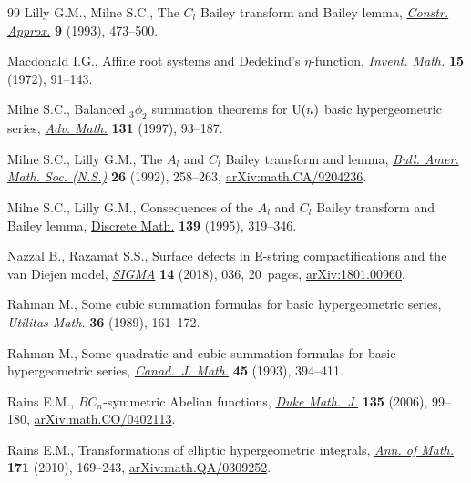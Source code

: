 \documentclass[pdftex]{sigma}%
\numberwithin{equation}{section}
\begin{document}
\begin{thebibliography}{99}
Lilly G.M., Milne S.C., The {$C_l$} {B}ailey transform and {B}ailey lemma,
 \href{https://doi.org/10.1007/BF01204652}{\textit{Constr. Approx.}} \textbf{9} (1993), 473--500.

Macdonald I.G., Affine root systems and {D}edekind's {$\eta $}-function,
 \href{https://doi.org/10.1007/BF01418931}{\textit{Invent. Math.}} \textbf{15} (1972), 91--143.

Milne S.C., Balanced {$_3\phi_2$} summation theorems for {${\rm U}(n)$} basic
 hypergeometric series, \href{https://doi.org/10.1006/aima.1997.1658}{\textit{Adv. Math.}} \textbf{131} (1997), 93--187.

Milne S.C., Lilly G.M., The {$A_l$} and {$C_l$} {B}ailey transform and lemma,
 \href{https://doi.org/10.1090/S0273-0979-1992-00268-9}{\textit{Bull. Amer. Math. Soc. (N.S.)}} \textbf{26} (1992), 258--263,
 \href{https://arxiv.org/abs/math.CA/9204236}{arXiv:math.CA/9204236}.

Milne S.C., Lilly G.M., Consequences of the {$A_l$} and {$C_l$} {B}ailey
 transform and {B}ailey lemma, \href{https://doi.org/10.1016/0012-365X(94)00139-A}{{Discrete Math.}} \textbf{139} (1995), 319--346.

Nazzal B., Razamat S.S., Surface defects in {E}-string compactifications and
 the van {D}iejen model, \href{https://doi.org/10.3842/SIGMA.2018.036}{\textit{SIGMA}} \textbf{14} (2018), 036, 20~pages,
 \href{https://arxiv.org/abs/1801.00960}{arXiv:1801.00960}.

Rahman M., Some cubic summation formulas for basic hypergeometric series,
 \textit{Utilitas Math.} \textbf{36} (1989), 161--172.

Rahman M., Some quadratic and cubic summation formulas for basic hypergeometric
 series, \href{https://doi.org/10.4153/CJM-1993-020-8}{\textit{Canad.~J. Math.}} \textbf{45} (1993), 394--411.

Rains E.M., {$BC_n$}-symmetric {A}belian functions, \href{https://doi.org/10.1215/S0012-7094-06-13513-5}{\textit{Duke Math.~J.}}
 \textbf{135} (2006), 99--180, \href{https://arxiv.org/abs/math.CO/0402113}{arXiv:math.CO/0402113}.

Rains E.M., Transformations of elliptic hypergeometric integrals, \href{https://doi.org/10.4007/annals.2010.171.169}{\textit{Ann.
 of Math.}} \textbf{171} (2010), 169--243, \href{https://arxiv.org/abs/math.QA/0309252}{arXiv:math.QA/0309252}.


\end{thebibliography}
\end{document}
